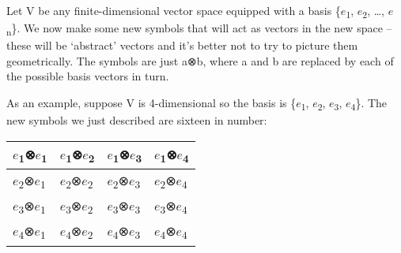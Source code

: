 \documentclass[oneside,english]{amsbook}
\numberwithin{section}{chapter}
\theoremstyle{plain}
\theoremstyle{definition}
\begin{document}
Let V be any finite-dimensional vector space equipped with a basis
\{$e$\textsubscript{1}, $e$\textsubscript{2}, \ldots,
$e$\textsubscript{n}\}. We now make some new symbols that will act as
vectors in the new space -- these will be `abstract' vectors and it's
better not to try to picture them geometrically. The symbols are just
a⊗b, where a and b are replaced by each of the possible basis vectors in
turn.

As an example, suppose V is 4-dimensional so the basis is
\{$e$\textsubscript{1}, $e$\textsubscript{2},
$e$\textsubscript{3}, $e$\textsubscript{4}\}. The new symbols we
just described are sixteen in number:

\begin{longtable}[]{@{}
		>{\centering\arraybackslash}p{}
		>{\centering\arraybackslash}p{}
		>{\centering\arraybackslash}p{}
		>{\centering\arraybackslash}p{}@{}}
	\toprule\noalign{}
	\begin{minipage}[b]{\linewidth}\centering
		$e$\textsubscript{1}⊗$e$\textsubscript{1}
	\end{minipage} & \begin{minipage}[b]{\linewidth}\centering
		$e$\textsubscript{1}⊗$e$\textsubscript{2}
	\end{minipage} & \begin{minipage}[b]{\linewidth}\centering
		$e$\textsubscript{1}⊗$e$\textsubscript{3}
	\end{minipage} & \begin{minipage}[b]{\linewidth}\centering
		$e$\textsubscript{1}⊗$e$\textsubscript{4}
	\end{minipage} \\
	\midrule\noalign{}
	\endhead
	\bottomrule\noalign{}
	\endlastfoot
	$e$\textsubscript{2}⊗$e$\textsubscript{1} &
	$e$\textsubscript{2}⊗$e$\textsubscript{2} &
	$e$\textsubscript{2}⊗$e$\textsubscript{3} &
	$e$\textsubscript{2}⊗$e$\textsubscript{4} \\
	$e$\textsubscript{3}⊗$e$\textsubscript{1} &
	$e$\textsubscript{3}⊗$e$\textsubscript{2} &
	$e$\textsubscript{3}⊗$e$\textsubscript{3} &
	$e$\textsubscript{3}⊗$e$\textsubscript{4} \\
	$e$\textsubscript{4}⊗$e$\textsubscript{1} &
	$e$\textsubscript{4}⊗$e$\textsubscript{2} &
	$e$\textsubscript{4}⊗$e$\textsubscript{3} &
	$e$\textsubscript{4}⊗$e$\textsubscript{4} \\
\end{longtable}
\end{document}
